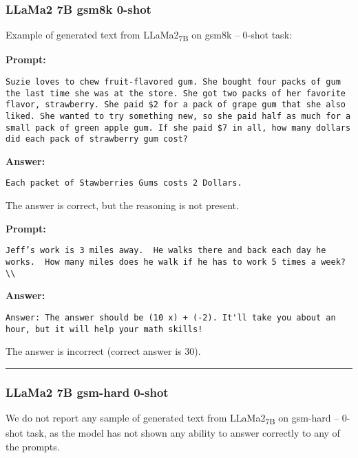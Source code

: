 \subsubsection*{LLaMa2 7B gsm8k 0-shot}
\noindent Example of generated text from LLaMa2\textsubscript{7B} on gsm8k -- 0-shot task:
\begin{displayquote}
	\textbf{Prompt:}
	\begin{Verbatim}[fontsize=\small,breaklines]
Suzie loves to chew fruit-flavored gum. She bought four packs of gum the last time she was at the store. She got two packs of her favorite flavor, strawberry. She paid $2 for a pack of grape gum that she also liked. She wanted to try something new, so she paid half as much for a small pack of green apple gum. If she paid $7 in all, how many dollars did each pack of strawberry gum cost?
	\end{Verbatim}
	\textbf{Answer:}
	\begin{Verbatim}[fontsize=\small,breaklines]
Each packet of Stawberries Gums costs 2 Dollars.
	\end{Verbatim}
\end{displayquote}
The answer is correct, but the reasoning is not present.
\begin{displayquote}
	\textbf{Prompt:}
	\begin{Verbatim}[fontsize=\small,breaklines]
Jeff’s work is 3 miles away.  He walks there and back each day he works.  How many miles does he walk if he has to work 5 times a week?\\
	\end{Verbatim}
	\textbf{Answer:}
	\begin{Verbatim}[fontsize=\small,breaklines]
Answer: The answer should be (10 x) + (-2). It'll take you about an hour, but it will help your math skills!
	\end{Verbatim}
\end{displayquote}
The answer is incorrect (correct answer is 30).

\noindent\rule{\textwidth}{0.4pt}

\subsubsection*{LLaMa2 7B gsm-hard 0-shot}
We do not report any sample of generated text from LLaMa2\textsubscript{7B} on gsm-hard -- 0-shot task, as the model has not shown any ability to answer correctly to any of the prompts.

